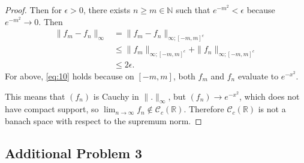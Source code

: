 \documentclass[12pt]{article}
\newcommand{\R}{\mathbb{R}}
\newcommand{\N}{\mathbb{N}}
\newcommand{\qal}[1]{\begin{align}#1\end{align}}
\newcommand{\clc}{\mathcal{C}_c(\R)}
\begin{document}
\begin{itemize}
\begin{proof}
        Then for $\epsilon > 0$, there exists $n \geq m \in \N$ such that $e^{-m^2} < \epsilon$ because $e^{-m^2} \to 0$. Then
        \qal{\|f_m - f_n\|_\infty &= \|f_m - f_n\|_{\infty; [-m, m]^c} \label{eq:10}\\
        &\leq \|f_m\|_{\infty; [-m, m]^c} + \|f_n\|_{\infty; [-m, m]^c} \nonumber\\
        &\leq 2\epsilon. \nonumber}
        For above, \eqref{eq:10} holds because on $[-m, m]$, both $f_m$ and $f_n$ evaluate to $e^{-x^2}$.

        This means that $(f_n)$ is Cauchy in $\|.\|_\infty$, but $(f_n) \to e^{-x^2}$, which does not have compact support, so $\lim_{n \to \infty} f_n \notin \clc$. Therefore $\clc$ is not a banach space with respect to the supremum norm.
    \end{proof}
\end{itemize}

\subsection*{Additional Problem 3}
\end{document}

